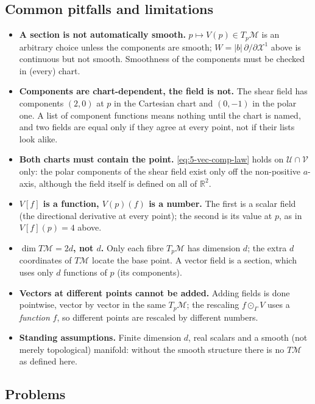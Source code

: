 \documentclass[11pt]{article}
\newcommand{\TpM}{T_p\mathcal M}
\begin{document}
\subsection*{Common pitfalls and limitations}

\begin{itemize}
  \item \textbf{A section is not automatically smooth.} $p\mapsto V(p)\in\TpM$ is an arbitrary choice unless the components are smooth; $W=|b|\,\partial/\partial\mathcal X^1$ above is continuous but not smooth. Smoothness of the components must be checked in (every) chart.
  \item \textbf{Components are chart-dependent, the field is not.} The shear field has components $(2,0)$ at $p$ in the Cartesian chart and $(0,-1)$ in the polar one. A list of component functions means nothing until the chart is named, and two fields are equal only if they agree at every point, not if their lists look alike.
  \item \textbf{Both charts must contain the point.} \eqref{eq:5-vec-comp-law} holds on $\mathcal U\cap\mathcal V$ only: the polar components of the shear field exist only off the non-positive $a$-axis, although the field itself is defined on all of $\mathbb R^2$.
  \item \textbf{$V[f]$ is a function, $V(p)(f)$ is a number.} The first is a scalar field (the directional derivative at every point); the second is its value at $p$, as in $V[f](p)=4$ above.
  \item \textbf{$\dim T\mathcal M=2d$, not $d$.} Only each fibre $\TpM$ has dimension $d$; the extra $d$ coordinates of $T\mathcal M$ locate the base point. A vector field is a section, which uses only $d$ functions of $p$ (its components).
  \item \textbf{Vectors at different points cannot be added.} Adding fields is done pointwise, vector by vector in the same $\TpM$; the rescaling $f\odot_\Gamma V$ uses a \emph{function} $f$, so different points are rescaled by different numbers.
  \item \textbf{Standing assumptions.} Finite dimension $d$, real scalars and a smooth (not merely topological) manifold: without the smooth structure there is no $T\mathcal M$ as defined here.
\end{itemize}

\subsection*{Problems}
\end{document}
